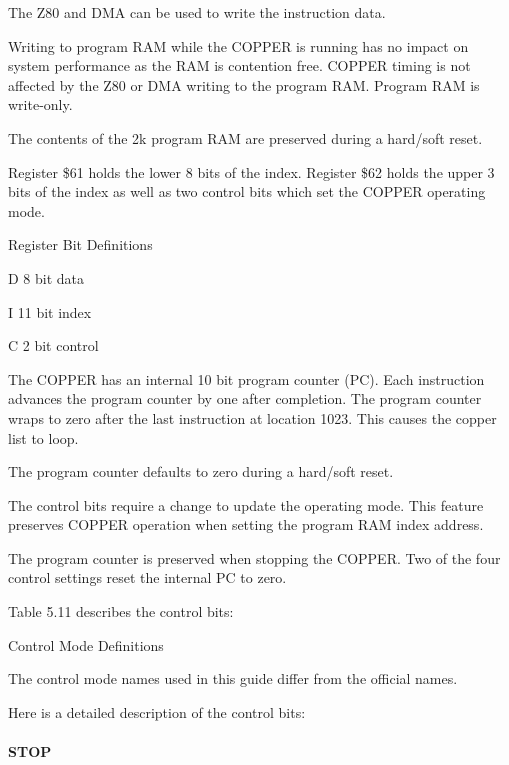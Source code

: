 The Z80 and DMA can be used to write the instruction data.

Writing to program RAM while the COPPER is running has no impact on
system performance as the RAM is contention free. COPPER timing is not
affected by the Z80 or DMA writing to the program RAM. Program RAM is
write-only.

The contents of the 2k program RAM are preserved during a hard/soft reset.

Register \$61 holds the lower 8 bits of the index. Register \$62 holds
the upper 3 bits of the index as well as two control bits which set
the COPPER operating mode.

\begin{table}[ht]\centering
  \caption{Register Bit Definitions}

  \raggedright D    8 bit data

  I   11 bit index 
  
  C   2 bit control
\end{table}

The COPPER has an internal 10 bit program counter (PC). Each
instruction advances the program counter by one after completion. The
program counter wraps to zero after the last instruction at location
1023. This causes the copper list to loop.

The program counter defaults to zero during a hard/soft reset.

The control bits require a change to update the operating mode. This
feature preserves COPPER operation when setting the program RAM index
address.

The program counter is preserved when stopping the COPPER. Two of the
four control settings reset the internal PC to zero.

Table 5.11 describes the control bits:

\begin{table}[ht]\centering
  \caption{Control Mode Definitions}

  \raggedright * The control mode names used in this guide differ from
  the official names.
\end{table}

Here is a detailed description of the control bits:

\paragraph{STOP}

